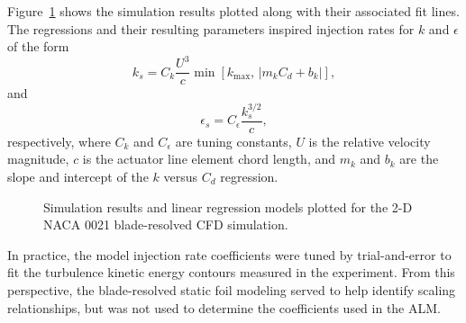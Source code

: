 Figure~\ref{fig:NACA-foil-fits} shows the simulation results plotted along with
their associated fit lines. The regressions and their resulting parameters
inspired injection rates for $k$ and $\epsilon$ of the form
\begin{equation}
    k_s = C_k \frac{U^3}{c} \min \left[ k_{\max} ,\, | m_k C_d +
    b_k | \right],
\end{equation}
and
\begin{equation}
    \epsilon_s = C_\epsilon \frac{k_s^{3/2}}{c},
\end{equation}
respectively, where $C_k$ and $C_\epsilon$ are tuning constants, $U$ is the
relative velocity magnitude, $c$ is the actuator line element chord length, and
$m_k$ and $b_k$ are the slope and intercept of the $k$ versus $C_d$ regression.

\begin{figure}
    \centering 
    
    \caption{Simulation results and linear regression models plotted for the 2-D
        NACA 0021 blade-resolved CFD simulation.}
    
    \label{fig:NACA-foil-fits}
\end{figure}

In practice, the model injection rate coefficients were tuned by trial-and-error
to fit the turbulence kinetic energy contours measured in the experiment. From
this perspective, the blade-resolved static foil modeling served to help
identify scaling relationships, but was not used to determine the coefficients
used in the ALM.
